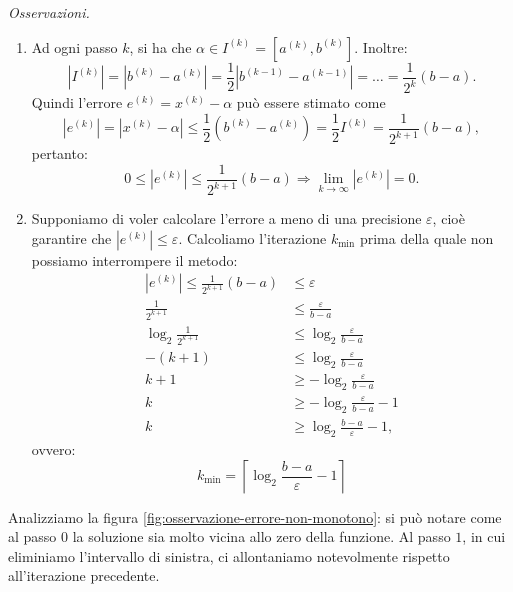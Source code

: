 \textit{Osservazioni.}
\begin{enumerate}
\item Ad ogni passo $k$, si ha che $\alpha \in I^{(k)} =\left[ a^{(k)} ,b^{(k)}\right]$. Inoltre:
\begin{equation*}
\left| I^{(k)}\right| =\left| b^{(k)} -a^{(k)}\right| =\frac{1}{2}\left| b^{( k-1)} -a^{( k-1)}\right| =\dotsc =\frac{1}{2^{k}}( b-a).
\end{equation*}
Quindi l'errore $e^{(k)} =x^{(k)} -\alpha $ può essere stimato come
\begin{equation*}
\left| e^{(k)}\right| =\left| x^{(k)} -\alpha \right| \leqslant \frac{1}{2}\left( b^{(k)} -a^{(k)}\right) =\frac{1}{2} I^{(k)} =\frac{1}{2^{k+1}}( b-a),
\end{equation*}
pertanto:
\begin{equation*}
0\leqslant \left| e^{(k)}\right| \leqslant \frac{1}{2^{k+1}}( b-a) \Rightarrow \lim _{k\rightarrow \infty }\left| e^{(k)}\right| =0.
\end{equation*}
\item Supponiamo di voler calcolare l'errore a meno di una precisione $\varepsilon$, cioè garantire che $\left| e^{(k)}\right| \leqslant \varepsilon$.
Calcoliamo l'iterazione $k_{\text{min}}$ prima della quale non possiamo interrompere il metodo:
\begin{align*}
\left| e^{(k)}\right| \leqslant \frac{1}{2^{k+1}}( b-a) & \leqslant \varepsilon \\
\frac{1}{2^{k+1}} & \leqslant \frac{\varepsilon }{b-a}\\
\log_{2}\frac{1}{2^{k+1}} & \leqslant \log_{2}\frac{\varepsilon }{b-a}\\
-( k+1) & \leqslant \log_{2}\frac{\varepsilon }{b-a}\\
k+1 & \geqslant -\log_{2}\frac{\varepsilon }{b-a}\\
k & \geqslant -\log_{2}\frac{\varepsilon }{b-a} -1\\
k & \geqslant \log_{2}\frac{b-a}{\varepsilon } -1,
\end{align*}
ovvero:
\begin{equation*}
k_{\text{min}} =\left\lceil \log_{2}\frac{b-a}{\varepsilon } -1\right\rceil
\end{equation*}
\end{enumerate}


Analizziamo la figura \ref{fig:osservazione-errore-non-monotono}: si può notare come al passo $0$ la soluzione sia molto vicina allo zero della funzione. Al passo $1$, in cui eliminiamo l'intervallo di sinistra, ci allontaniamo notevolmente rispetto all'iterazione precedente.

